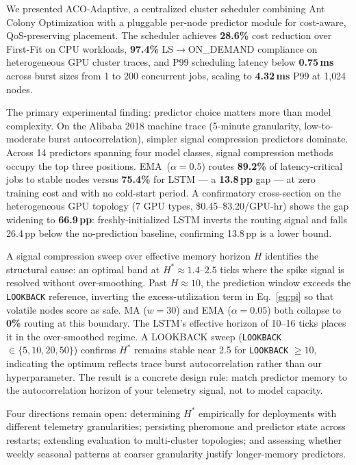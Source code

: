 \documentclass[conference]{IEEEtran}
\begin{document}
We presented ACO-Adaptive, a centralized cluster scheduler combining Ant
Colony Optimization with a pluggable per-node predictor module for
cost-aware, QoS-preserving placement. The scheduler achieves
\textbf{28.6\%} cost reduction over First-Fit on CPU workloads,
\textbf{97.4\%} LS$\to$ON\_DEMAND compliance on heterogeneous GPU cluster
traces, and P99 scheduling latency below \textbf{0.75\,ms} across burst
sizes from 1 to 200 concurrent jobs, scaling to \textbf{4.32\,ms} P99 at
1{,}024 nodes.

The primary experimental finding: predictor choice matters more than model
complexity. On the Alibaba 2018 machine trace (5-minute granularity,
low-to-moderate burst autocorrelation), simpler signal compression
predictors dominate. Across 14 predictors spanning four model classes,
signal compression methods occupy the top three positions.
EMA~($\alpha{=}0.5$) routes \textbf{89.2\%} of latency-critical jobs to
stable nodes versus \textbf{75.4\%} for LSTM --- a \textbf{13.8\,pp} gap
--- at zero training cost and with no cold-start period. A confirmatory
cross-section on the heterogeneous GPU topology (7 GPU types,
\$0.45--\$3.20/GPU-hr) shows the gap widening to \textbf{66.9\,pp}:
freshly-initialized LSTM inverts the routing signal and falls 26.4\,pp
below the no-prediction baseline, confirming 13.8\,pp is a lower bound.

A signal compression sweep over effective memory horizon $H$ identifies
the structural cause: an optimal band at $H^{*}{\approx}1.4$--$2.5$ ticks
where the spike signal is resolved without over-smoothing. Past
$H{\approx}10$, the prediction window exceeds the \texttt{LOOKBACK}
reference, inverting the excess-utilization term in Eq.~\ref{eq:pi} so
that volatile nodes score as safe. MA ($w{=}30$) and EMA ($\alpha{=}0.05$) both collapse to
\textbf{0\%} routing at this boundary. The LSTM's effective horizon of
10--16 ticks places it in the over-smoothed regime. A LOOKBACK sweep
(\texttt{LOOKBACK} $\in \{5,10,20,50\}$) confirms $H^*$ remains stable
near 2.5 for \texttt{LOOKBACK} $\geq 10$, indicating the optimum
reflects trace burst autocorrelation rather than our hyperparameter.
The result is a concrete design rule: match predictor memory to the
autocorrelation horizon of your telemetry signal, not to model capacity.

Four directions remain open: determining $H^{*}$ empirically for
deployments with different telemetry granularities; persisting pheromone
and predictor state across restarts; extending evaluation to multi-cluster
topologies; and assessing whether weekly seasonal patterns at coarser
granularity justify longer-memory predictors.
\end{document}
